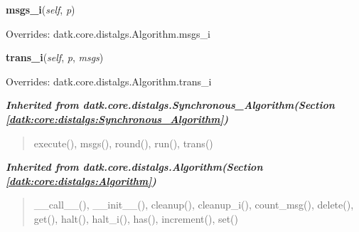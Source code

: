     \vspace{0.5ex}

\hspace{.8\funcindent}\begin{boxedminipage}{\funcwidth}

    \raggedright \textbf{msgs\_i}(\textit{self}, \textit{p})

\setlength{\parskip}{2ex}
\setlength{\parskip}{1ex}
      Overrides: datk.core.distalgs.Algorithm.msgs\_i

    \end{boxedminipage}

    \vspace{0.5ex}

\hspace{.8\funcindent}\begin{boxedminipage}{\funcwidth}

    \raggedright \textbf{trans\_i}(\textit{self}, \textit{p}, \textit{msgs})

\setlength{\parskip}{2ex}
\setlength{\parskip}{1ex}
      Overrides: datk.core.distalgs.Algorithm.trans\_i

    \end{boxedminipage}


\large{\textbf{\textit{Inherited from datk.core.distalgs.Synchronous\_Algorithm\textit{(Section \ref{datk:core:distalgs:Synchronous_Algorithm})}}}}

\begin{quote}
execute(), msgs(), round(), run(), trans()
\end{quote}

\large{\textbf{\textit{Inherited from datk.core.distalgs.Algorithm\textit{(Section \ref{datk:core:distalgs:Algorithm})}}}}

\begin{quote}
\_\_call\_\_(), \_\_init\_\_(), cleanup(), cleanup\_i(), count\_msg(), delete(), get(), halt(), halt\_i(), has(), increment(), set()
\end{quote}



